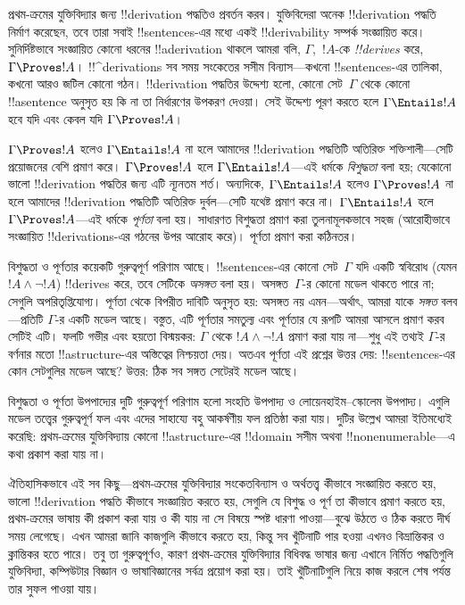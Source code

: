 \documentclass[../../../include/open-logic-section]{subfiles}
\begin{document}


প্রথম-ক্রমের যুক্তিবিদ্যার জন্য !!{derivation} পদ্ধতিও প্রবর্তন করব।
যুক্তিবিদেরা অনেক !!{derivation} পদ্ধতি নির্মাণ করেছেন, তবে তারা সবাই
!!{sentence}s-এর মধ্যে একই !!{derivability} সম্পর্ক সংজ্ঞায়িত করে।
সুনির্দিষ্টভাবে সংজ্ঞায়িত কোনো ধরনের !!a{derivation} থাকলে আমরা বলি,
$\Gamma$,~$!A$-কে \emph{!!{derive}s} করে, $\Gamma \Proves !A$।
!!^{derivation}s সব সময় সংকেতের সসীম বিন্যাস—কখনো !!{sentence}s-এর
তালিকা, কখনো আরও জটিল কোনো গঠন। !!{derivation} পদ্ধতির উদ্দেশ্য হলো,
কোনো সেট~$\Gamma$ থেকে কোনো !!a{sentence} অনুসৃত হয় কি না তা নির্ধারণের
উপকরণ দেওয়া। সেই উদ্দেশ্য পূরণ করতে হলে $\Gamma \Entails !A$ হবে যদি
এবং কেবল যদি $\Gamma \Proves !A$।

$\Gamma \Proves !A$ হলেও $\Gamma \Entails !A$ না হলে আমাদের
!!{derivation} পদ্ধতিটি অতিরিক্ত শক্তিশালী—সেটি প্রয়োজনের বেশি প্রমাণ
করে। $\Gamma \Proves !A$ হলে $\Gamma \Entails !A$—এই ধর্মকে
\emph{বিশুদ্ধতা} বলা হয়; যেকোনো ভালো !!{derivation} পদ্ধতির জন্য এটি
ন্যূনতম শর্ত। অন্যদিকে, $\Gamma \Entails !A$ হলেও $\Gamma \Proves !A$
না হলে আমাদের !!{derivation} পদ্ধতিটি অতিরিক্ত দুর্বল—সেটি যথেষ্ট প্রমাণ
করে না। $\Gamma \Entails !A$ হলে $\Gamma \Proves !A$—এই ধর্মকে
\emph{পূর্ণতা} বলা হয়। সাধারণত বিশুদ্ধতা প্রমাণ করা তুলনামূলকভাবে সহজ
(আরোহীভাবে সংজ্ঞায়িত !!{derivation}s-এর গঠনের উপর আরোহ করে)। পূর্ণতা
প্রমাণ করা কঠিনতর।

বিশুদ্ধতা ও পূর্ণতার কয়েকটি গুরুত্বপূর্ণ পরিণাম আছে। !!{sentence}s-এর
কোনো সেট~$\Gamma$ যদি একটি স্ববিরোধ (যেমন $!A \land \lnot !A$)
!!{derive}s করে, তবে সেটিকে \emph{অসঙ্গত} বলা হয়। অসঙ্গত~$\Gamma$-র কোনো
মডেল থাকতে পারে না; সেগুলি অপরিতৃপ্তিযোগ্য। পূর্ণতা থেকে বিপরীত দাবিটি
অনুসৃত হয়: অসঙ্গত নয় এমন—অর্থাৎ, আমরা যাকে \emph{সঙ্গত} বলব—প্রতিটি
$\Gamma$-র একটি মডেল আছে। বস্তুত, এটি পূর্ণতার সমতুল্য এবং পূর্ণতার যে
রূপটি আমরা আসলে প্রমাণ করব সেটিই এটি। ফলটি গভীর এবং হয়তো বিস্ময়কর:
$\Gamma$ থেকে $!A \land \lnot !A$ প্রমাণ করা যায় না—শুধু এই তথ্যই
$\Gamma$-র বর্ণনার মতো !!a{structure}-এর অস্তিত্বের নিশ্চয়তা দেয়।
অতএব পূর্ণতা এই প্রশ্নের উত্তর দেয়: !!{sentence}s-এর কোন সেটগুলির মডেল
আছে? উত্তর: ঠিক সব সঙ্গত সেটেরই মডেল আছে।

বিশুদ্ধতা ও পূর্ণতা উপপাদ্যের দুটি গুরুত্বপূর্ণ পরিণাম হলো সংহতি উপপাদ্য
ও লোয়েনহাইম--স্কোলেম উপপাদ্য। এগুলি মডেল তত্ত্বের গুরুত্বপূর্ণ ফল এবং
এদের সাহায্যে বহু আকর্ষণীয় ফল প্রতিষ্ঠা করা যায়। দুটির উল্লেখ আমরা
ইতিমধ্যেই করেছি: প্রথম-ক্রমের যুক্তিবিদ্যায় কোনো !!a{structure}-এর
!!{domain} সসীম অথবা !!{nonenumerable}—এ কথা প্রকাশ করা যায় না।

ঐতিহাসিকভাবে এই সব কিছু—প্রথম-ক্রমের যুক্তিবিদ্যার সংকেতবিন্যাস ও
অর্থতত্ত্ব কীভাবে সংজ্ঞায়িত করতে হয়, ভালো !!{derivation} পদ্ধতি কীভাবে
সংজ্ঞায়িত করতে হয়, সেগুলি যে বিশুদ্ধ ও পূর্ণ তা কীভাবে প্রমাণ করতে হয়,
প্রথম-ক্রমের ভাষায় কী প্রকাশ করা যায় ও কী যায় না সে বিষয়ে স্পষ্ট
ধারণা পাওয়া—বুঝে উঠতে ও ঠিক করতে দীর্ঘ সময় লেগেছে। এখন আমরা জানি
কাজগুলি কীভাবে করতে হয়, কিন্তু সব খুঁটিনাটি পার হওয়া এখনও বিভ্রান্তিকর
ও ক্লান্তিকর হতে পারে। তবু তা গুরুত্বপূর্ণও, কারণ প্রথম-ক্রমের
যুক্তিবিদ্যার বিধিবদ্ধ ভাষার জন্য এখানে নির্মিত পদ্ধতিগুলি যুক্তিবিদ্যা,
কম্পিউটার বিজ্ঞান ও ভাষাবিজ্ঞানের সর্বত্র প্রয়োগ করা হয়। তাই
খুঁটিনাটিগুলি নিয়ে কাজ করলে শেষ পর্যন্ত তার সুফল পাওয়া যায়।
\end{document}
